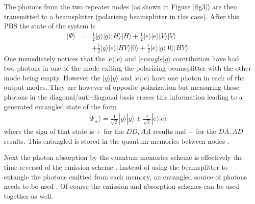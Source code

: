 \documentclass[twocolumn, aps, rmp, amsmath, amssymb, nofootinbib, superscriptaddress, longbibliography, floatfix, table-of-contents, eqsecnum]{revtex4-1}
\begin{document}
The photons from the two repeater nodes (as shown in Figure \ref{fig3}) are then transmitted to a beamsplitter (polarising beamsplitter in this case). After this PBS the state of the system is
\begin{align}
|\Psi\rangle&=&\frac{1}{2} |g\rangle |g\rangle |H\rangle |H\rangle +\frac{1}{2} |e\rangle |e\rangle |V\rangle |V\rangle \nonumber \\
&\;&+\frac{1}{2} |g\rangle |e\rangle |HV\rangle |0\rangle + \frac{1}{2} |e\rangle |g\rangle |0\rangle |HV\rangle 
\end{align}
One immediately notices that the $|e\rangle |e\rangle$ and  $|erangle |g\rangle$ contribution have had two photons in one of the mode exiting the polarizing beamsplitter with the other mode being empty. However the 
$|g\rangle |g\rangle$ and $|e\rangle |e\rangle$ have one photon in each of the output modes. They are however of opposite polarization but measuring those photons in the diagonal/anti-diagonal basis erases this information leading to a generated entangled state of the form
\begin{align}
|\Psi_\pm\rangle=\frac{1}{\sqrt{2}} |g\rangle |g\rangle \pm \frac{1}{\sqrt{2}} |e\rangle |e\rangle
\end{align}
where the sign of that state is $+$ for the $DD,AA$ results and $-$ for the $DA,AD$ results. This entangled is stored in the quantum memories between nodes \cite{}. 

Next the photon absorption by the quantum memories scheme is effectively the time reversal of the emission scheme \cite{}. Instead of using the beamsplitter to entangle the photons emitted from each memory, an entangled source of photons needs to be used \cite{}.  Of course the emission and absorption schemes can be used together as well.
\end{document}
